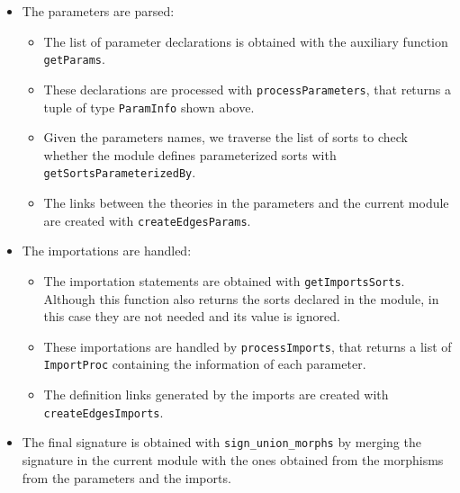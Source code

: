 \begin{itemize}
\item The parameters are parsed:

\begin{itemize}
\item The list of parameter declarations is obtained with the auxiliary
function \verb"getParams".
\item These declarations are processed with \verb"processParameters",
that returns a tuple of type \verb"ParamInfo" shown above.
\item Given the parameters names, we traverse the list of sorts to check
whether the module defines parameterized sorts with \verb"getSortsParameterizedBy".
\item The links between the theories in the parameters and the current module
are created with \verb"createEdgesParams".
\end{itemize}

\item The importations are handled:

\begin{itemize}
\item The importation statements are obtained with \verb"getImportsSorts".
Although this function also returns the sorts declared in the module, in
this case they are not needed and its value is ignored.
\item These importations are handled by \verb"processImports", that
returns a list of \verb"ImportProc" containing the information of each
parameter.
\item The definition links generated by the imports are created with
\verb"createEdgesImports".
\end{itemize}

\item The final signature is obtained with \verb"sign_union_morphs"
by merging the signature in the current module with the ones obtained
from the morphisms from the parameters and the imports.

\end{itemize}

